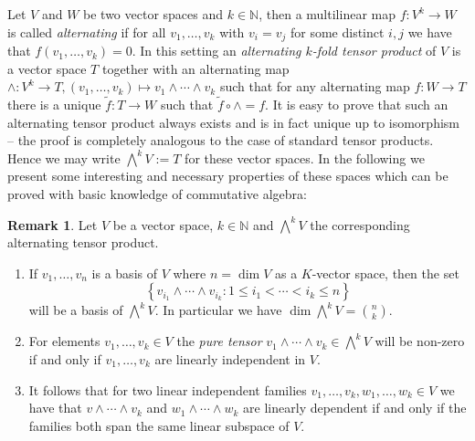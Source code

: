 \documentclass[
  paper=a4,
  DIV=14,
  fontsize=12pt,
  titlepage,
  bibliography=totoc,
  pagesize=pdftex
]{scrartcl}
\numberwithin{figure}{section}
\numberwithin{equation}{section}
\numberwithin{table}{section}
\newcommand*\setN{\mathds{N}}
\theoremstyle{definition}
\newtheorem{remark}[definition]{Remark}
\numberwithin{definition}{section}
\begin{document}
Let $V$ and $W$ be two vector spaces and $k\in\setN$, then a multilinear map $f : V^k \to
W$ is called \emph{alternating} if for all $v_1, \dots, v_k$ with $v_i=v_j$ for some
distinct $i,j$ we have that $f(v_1, \dots, v_k) = 0$. In this setting an \emph{alternating
$k$-fold tensor product} of $V$ is a vector space $T$ together with an alternating map
$\wedge:V^k\to T, (v_1, \dots, v_k) \mapsto v_1\wedge\cdots\wedge v_k$ such that for any
alternating map $f:W\to T$ there is a unique $\tilde f:T\to W$ such that $\tilde f \circ
\wedge = f$. It is easy to prove that such an alternating tensor product always exists and
is in fact unique up to isomorphism -- the proof is completely analogous to the case of
standard tensor products. Hence we may write $\bigwedge^k V := T$ for these vector spaces.
In the following we present some interesting and necessary properties of these spaces
which can be proved with basic knowledge of commutative algebra:

\begin{remark}
  Let $V$ be a vector space, $k \in \setN$ and $\bigwedge^k V$ the corresponding alternating
  tensor product.
  \begin{enumerate}
    \item If $v_1, \dots, v_n$ is a basis of $V$ where $n=\dim V$ as a $K$-vector space,
      then the set
      \[
        \left\{
          v_{i_1} \wedge \cdots \wedge v_{i_k} : 1\leq i_1 < \cdots < i_k \leq n
        \right\}
      \]
      will be a basis of $\bigwedge^kV$. In particular we have $\dim\bigwedge^kV = \binom
      nk$.
    \item For elements $v_1, \dots, v_k \in V$ the \emph{pure tensor} $v_1\wedge \cdots
      \wedge v_k \in \bigwedge^kV$ will be non-zero if and only if $v_1, \dots, v_k$ are
      linearly independent in $V$.
    \item It follows that for two linear independent families $v_1, \dots, v_k, w_1,
      \dots, w_k \in V$ we have that $v\wedge\cdots \wedge v_k$ and $w_1\wedge\cdots\wedge
      w_k$ are linearly dependent if and only if the families both span the same linear
      subspace of $V$.
  \end{enumerate}
\end{remark}
\end{document}
